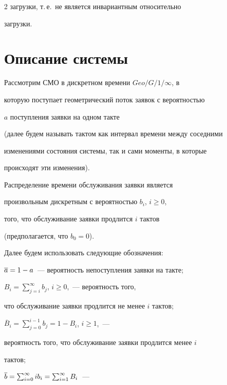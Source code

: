 \begin{multicols}{2}
загрузки, т.\,е.\ не является инвариантным относительно


загрузки.





\section{Описание системы}





Рассмотрим СМО в дискретном времени $Geo/G/1/\infty$, в


которую поступает геометрический поток заявок с вероятностью


$a$ поступления заявки на одном такте


(далее будем называть тактом как интервал времени между соседними


изменениями состояния системы, так и сами моменты, в которые


происходят эти изменения).


Распределение времени обслуживания заявки является


произвольным дискретным с вероятностью $b_i$, $i\ge 0$,


того, что обслуживание заявки продлится $i$ тактов


(предполагается, что $b_0=0$).





Далее будем использовать следующие обозначения:





$\overline a=1-a$~--- вероятность непоступления заявки на такте;





$B_i=\sum_{j=i}^\infty b_j$, $i\ge0$,~--- вероятность того,


что обслуживание заявки продлится не менее $i$ тактов;





$\overline B_i=\sum_{j=0}^{i-1} b_j = 1-B_i$,  $i\ge 1$,~---


вероятность того, что обслуживание заявки продлится менее $i$


тактов;





$\overline b = \sum_{i=0}^\infty i b_i = \sum_{i=1}^\infty B_i$~---



\end{multicols}
